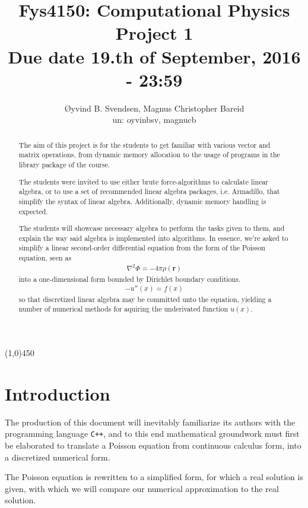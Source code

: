 \documentclass[11pt,a4paper,notitlepage]{article}
\title{\normalsize Fys4150: Computational Physics \\
\vspace{10mm}
\huge Project 1\\
\vspace{10mm}
\normalsize Due date {\bf 19.th of September, 2016 - 23:59}}
\author{Øyvind B. Svendsen, Magnus Christopher Bareid \\ un: oyvinbsv, magnucb}
\begin{document}
\noindent
\maketitle
\vspace{10mm}
\begin{abstract}
The aim of this project is for the students to get familiar with various vector and matrix operations, from dynamic memory allocation to the usage of programs in the library package of the course.

The students were invited to use either brute force-algorithms to calculate linear algebra, or to use a set of recommended linear algebra packages, i.e. Armadillo, that simplify the syntax of linear algebra. Additionally, dynamic memory handling is expected.

The students will showcase necessary algebra to perform the tasks given to them, and explain the way said algebra is implemented into algorithms. In essence, we're asked to simplify a linear second-order differential equation from the form of the Poisson equation, seen as
\begin{align*}
\nabla ^2 \Phi = -4\pi\rho(\mathbf{r})
\end{align*}
into a one-dimensional form bounded by Dirichlet boundary conditions.
\begin{align*}
-u''(x) = f(x)
\end{align*}
so that discretized linear algebra may be committed unto the equation, yielding a number of numerical methods for aquiring the underivated function $u(x)$.
\end{abstract}
\begin{center}
\line(1,0){450}
\end{center}

\newpage
\tableofcontents

\newpage
\section{Introduction}
The production of this document will inevitably familiarize its authors with the programming language \verb|C++|, and to this end mathematical groundwork must first be elaborated to translate a Poisson equation from continuous calculus form, into a discretized numerical form.

The Poisson equation is rewritten to a simplified form, for which a real solution is given, with which we will compare our numerical approximation to the real solution.
\end{document}
